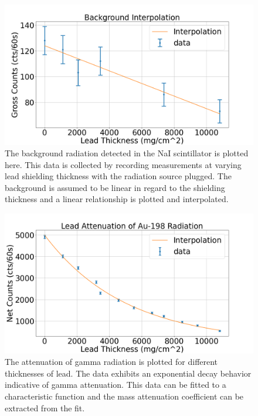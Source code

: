 \begin{figure}
\centering
\includegraphics[width=\textwidth]{background.png}
\caption{The background radiation detected in the NaI scintillator is plotted here. This data is collected by recording measurements at varying lead shielding thickness with the radiation source plugged. The background is assumed to be linear in regard to the shielding thickness and a linear relationship is plotted and interpolated.}
\label{fig:background}
\end{figure}

\begin{figure}
\centering
\includegraphics[width=\textwidth]{Pb.png}
\caption{The attenuation of gamma radiation is plotted for different thicknesses of lead. The data exhibits an exponential decay behavior indicative of gamma attenuation. This data can be fitted to a characteristic function and the mass attenuation coefficient can be extracted from the fit.}
\label{fig:Pb}
\end{figure}

